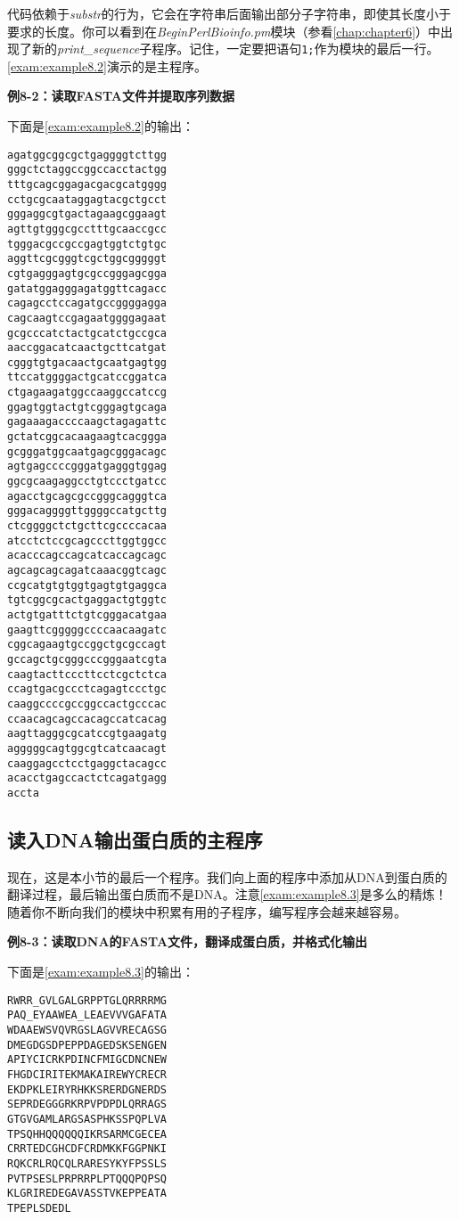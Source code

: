 代码依赖于\textit{substr}的行为，它会在字符串后面输出部分子字符串，即使其长度小于要求的长度。你可以看到在\textit{BeginPerlBioinfo.pm}模块（参看\autoref{chap:chapter6}）中出现了新的\textit{print\_sequence}子程序。记住，一定要把语句\verb|1;|作为模块的最后一行。\autoref{exam:example8.2}演示的是主程序。

\textbf{例8-2：读取FASTA文件并提取序列数据}


下面是\autoref{exam:example8.2}的输出：

\begin{lstlisting}
agatggcggcgctgaggggtcttgg
gggctctaggccggccacctactgg
tttgcagcggagacgacgcatgggg
cctgcgcaataggagtacgctgcct
gggaggcgtgactagaagcggaagt
agttgtgggcgcctttgcaaccgcc
tgggacgccgccgagtggtctgtgc
aggttcgcgggtcgctggcgggggt
cgtgagggagtgcgccgggagcgga
gatatggagggagatggttcagacc
cagagcctccagatgccggggagga
cagcaagtccgagaatggggagaat
gcgcccatctactgcatctgccgca
aaccggacatcaactgcttcatgat
cgggtgtgacaactgcaatgagtgg
ttccatggggactgcatccggatca
ctgagaagatggccaaggccatccg
ggagtggtactgtcgggagtgcaga
gagaaagaccccaagctagagattc
gctatcggcacaagaagtcacggga
gcgggatggcaatgagcgggacagc
agtgagccccgggatgagggtggag
ggcgcaagaggcctgtccctgatcc
agacctgcagcgccgggcagggtca
gggacaggggttggggccatgcttg
ctcggggctctgcttcgccccacaa
atcctctccgcagcccttggtggcc
acacccagccagcatcaccagcagc
agcagcagcagatcaaacggtcagc
ccgcatgtgtggtgagtgtgaggca
tgtcggcgcactgaggactgtggtc
actgtgatttctgtcgggacatgaa
gaagttcgggggccccaacaagatc
cggcagaagtgccggctgcgccagt
gccagctgcgggcccgggaatcgta
caagtacttcccttcctcgctctca
ccagtgacgccctcagagtccctgc
caaggccccgccggccactgcccac
ccaacagcagccacagccatcacag
aagttagggcgcatccgtgaagatg
agggggcagtggcgtcatcaacagt
caaggagcctcctgaggctacagcc
acacctgagccactctcagatgagg
accta
\end{lstlisting}

\subsection{读入DNA输出蛋白质的主程序}
现在，这是本小节的最后一个程序。我们向上面的程序中添加从DNA到蛋白质的翻译过程，最后输出蛋白质而不是DNA。注意\autoref{exam:example8.3}是多么的精炼！随着你不断向我们的模块中积累有用的子程序，编写程序会越来越容易。

\textbf{例8-3：读取DNA的FASTA文件，翻译成蛋白质，并格式化输出}


下面是\autoref{exam:example8.3}的输出：

\begin{lstlisting}
RWRR_GVLGALGRPPTGLQRRRRMG
PAQ_EYAAWEA_LEAEVVVGAFATA
WDAAEWSVQVRGSLAGVVRECAGSG
DMEGDGSDPEPPDAGEDSKSENGEN
APIYCICRKPDINCFMIGCDNCNEW
FHGDCIRITEKMAKAIREWYCRECR
EKDPKLEIRYRHKKSRERDGNERDS
SEPRDEGGGRKRPVPDPDLQRRAGS
GTGVGAMLARGSASPHKSSPQPLVA
TPSQHHQQQQQQIKRSARMCGECEA
CRRTEDCGHCDFCRDMKKFGGPNKI
RQKCRLRQCQLRARESYKYFPSSLS
PVTPSESLPRPRRPLPTQQQPQPSQ
KLGRIREDEGAVASSTVKEPPEATA
TPEPLSDEDL
\end{lstlisting}


